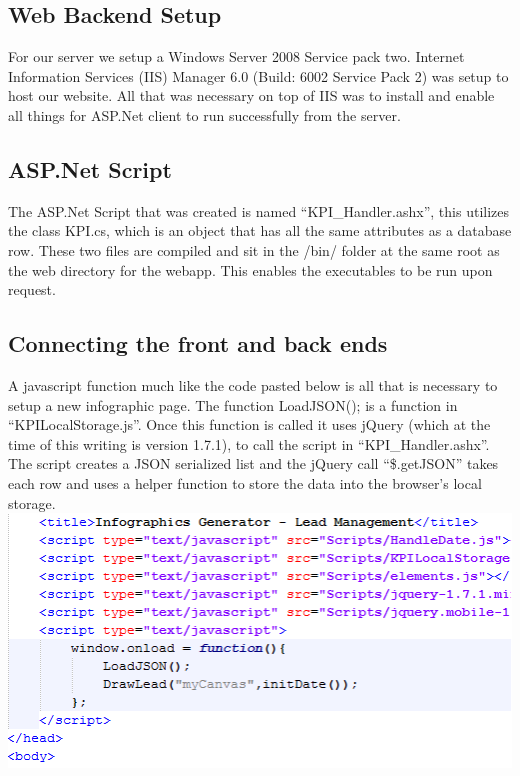 \documentclass[11pt,a4paper,oneside]{article}
\begin{document}
\subsection{Web Backend Setup}
For our server we setup a Windows Server 2008 Service pack two. Internet Information Services (IIS) Manager 6.0 (Build: 6002 Service Pack 2) was setup to host our website. All that was necessary on top of IIS was to install and enable all things for ASP.Net client to run successfully from the server.\\

\subsection{ASP.Net Script}
The ASP.Net Script that was created is named “KPI\_Handler.ashx”, this utilizes the class KPI.cs, which is an object that has all the same attributes as a database row. These two files are compiled and sit in the /bin/ folder at the same root as the web directory for the webapp. This enables the executables to be run upon request.\\

\subsection{Connecting the front and back ends}
A javascript function much like the code pasted below is all that is necessary to setup a new infographic page. The function LoadJSON(); is a function in “KPILocalStorage.js”. Once this function is called it uses jQuery (which at the time of this writing is version 1.7.1), to call the script in “KPI\_Handler.ashx”. The script creates a JSON serialized list and the jQuery call “\$.getJSON” takes each row and uses a helper function to store the data into the browser’s local storage.\\

\includegraphics[width=.9\textwidth]{images/LoadJSON.png}\\   
\end{document}
